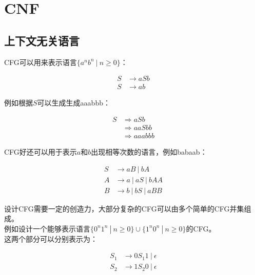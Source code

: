 \newpage

\section{CNF}

\subsection{上下文无关语言}

CFG可以用来表示语言$ \{a^nb^n\ |\ n \ge 0\} $：

\vspace{-1cm}

\begin{align*}
    S & \rightarrow aSb \\
    S & \rightarrow ab
\end{align*}

例如根据$ S $可以生成生成aaabbb：

\vspace{-1cm}

\begin{align*}
    S & \Rightarrow aSb    \\
      & \Rightarrow aaSbb  \\
      & \Rightarrow aaabbb
\end{align*}

CFG好还可以用于表示$ a $和$ b $出现相等次数的语言，例如babaab：

\vspace{-1cm}

\begin{align*}
    S & \rightarrow aB\ |\ bA        \\
    A & \rightarrow a\ |\ aS\ |\ bAA \\
    B & \rightarrow b\ |\ bS\ |\ aBB
\end{align*}

设计CFG需要一定的创造力，大部分复杂的CFG可以由多个简单的CFG并集组成。\\

例如设计一个能够表示语言$ \{0^n1^n\ |\ n \ge 0\} \cup \{1^n0^n\ |\ n \ge 0\} $的CFG。\\

这两个部分可以分别表示为：

\vspace{-1cm}

\begin{align*}
    S_1 & \rightarrow 0S_{1}1\ |\ \epsilon \\
    S_2 & \rightarrow 1S_{2}0\ |\ \epsilon
\end{align*}

